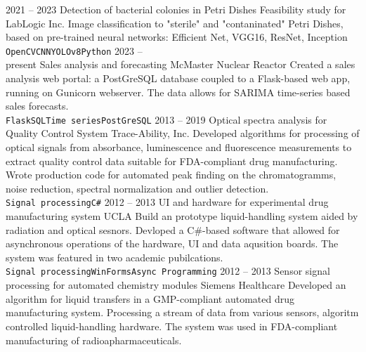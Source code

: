 \documentclass[9pt]{developercv} %
\begin{document}


\begin{entrylist}
	\entry
	{2021 -- 2023}
	{Detection of bacterial colonies in Petri Dishes}
	{Feasibility study for LabLogic Inc.}
	{Image classification to "sterile" and "contaninated" Petri Dishes, based on pre-trained neural networks: Efficient Net, VGG16, ResNet, Inception \\ \texttt{OpenCV}\slashsep\texttt{CNN}\slashsep\texttt{YOLOv8}\slashsep\texttt{Python}}
	\entry
	{2023 -- \\\footnotesize{present}}
	{Sales analysis and forecasting}
	{McMaster Nuclear Reactor}
	{Created a sales analysis web portal: a PostGreSQL database coupled to a Flask-based web app, running on Gunicorn webserver. The data allows for SARIMA time-series based sales forecasts.\\ \texttt{Flask}\slashsep\texttt{SQL}\slashsep\texttt{Time series}\slashsep\texttt{PostGreSQL}}
	\entry
	{2013 -- 2019}
	{Optical spectra analysis for Quality Control System}
	{Trace-Ability, Inc.}
	{Developed algorithms for processing of optical signals from absorbance, luminescence and fluorescence measurements to extract quality control data suitable for FDA-compliant drug manufacturing. Wrote production code for automated peak finding on the chromatogramms, noise reduction, spectral normalization and outlier detection.  \\ \texttt{Signal processing}\slashsep\texttt{C\#}}
	\entry
	{2012 -- 2013}
	{UI and hardware for experimental drug manufacturing system}
	{UCLA}
	{Build an prototype liquid-handling system aided by radiation and optical sesnors. Devloped a C\#-based software that allowed for asynchronous operations of the hardware, UI and data aqusition boards. The system was featured in two academic pubilcations. \\ \texttt{Signal processing}\slashsep\texttt{WinForms}\slashsep\texttt{Async Programming}}
	\entry
	{2012 -- 2013}
	{Sensor signal processing for automated chemistry modules}
	{Siemens Healthcare}
	{Developed an algorithm for liquid transfers in a GMP-compliant automated drug manufacturing system. Processing a stream of data from various sensors, algoritm controlled liquid-handling hardware. The system was used in FDA-compliant manufacturing of radioapharmaceuticals.}
\end{entrylist}
\end{document}
